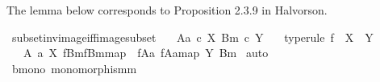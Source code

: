 \begin{isabellebody}
\isamarkupfalse%
%
\endisatagproof
{\isafoldproof}%
%
\isadelimproof
%
\endisadelimproof
%
\begin{isamarkuptext}%
The lemma below corresponds to Proposition 2.3.9 in Halvorson.%
\end{isamarkuptext}\isamarkuptrue%
\isamarkupfalse%
\ subset{\isacharunderscore}{\kern0pt}inv{\isacharunderscore}{\kern0pt}image{\isacharunderscore}{\kern0pt}iff{\isacharunderscore}{\kern0pt}image{\isacharunderscore}{\kern0pt}subset{\isacharcolon}{\kern0pt}\isanewline
\ \ \ {\isachardoublequoteopen}{\isacharparenleft}{\kern0pt}A{\isacharcomma}{\kern0pt}a{\isacharparenright}{\kern0pt}\ {\isasymsubseteq}\isactrlsub c\ X{\isachardoublequoteclose}\ {\isachardoublequoteopen}{\isacharparenleft}{\kern0pt}B{\isacharcomma}{\kern0pt}m{\isacharparenright}{\kern0pt}\ {\isasymsubseteq}\isactrlsub c\ Y{\isachardoublequoteclose}\ \isanewline
\ \ type{\isacharunderscore}{\kern0pt}rule{\isacharbrackright}{\kern0pt}{\isacharcolon}{\kern0pt}\ {\isachardoublequoteopen}f\ {\isacharcolon}{\kern0pt}\ X\ {\isasymrightarrow}\ Y{\isachardoublequoteclose}\isanewline
\ \ \ {\isachardoublequoteopen}{\isacharparenleft}{\kern0pt}{\isacharparenleft}{\kern0pt}A{\isacharcomma}{\kern0pt}\ a{\isacharparenright}{\kern0pt}\ {\isasymsubseteq}\isactrlbsub X\isactrlesub \ {\isacharparenleft}{\kern0pt}f\isactrlsup {\isacharminus}{\kern0pt}B{\isasymrparr}\isactrlbsub m\isactrlesub {\isacharcomma}{\kern0pt}{\isacharbrackleft}{\kern0pt}f\isactrlsup {\isacharminus}{\kern0pt}B{\isasymrparr}\isactrlbsub m\isactrlesub {\isacharbrackright}{\kern0pt}map{\isacharparenright}{\kern0pt}{\isacharparenright}{\kern0pt}\ {\isacharequal}{\kern0pt}\ {\isacharparenleft}{\kern0pt}{\isacharparenleft}{\kern0pt}f{\isasymlparr}A{\isasymrparr}\isactrlbsub a\isactrlesub {\isacharcomma}{\kern0pt}\ {\isacharbrackleft}{\kern0pt}f{\isasymlparr}A{\isasymrparr}\isactrlbsub a\isactrlesub {\isacharbrackright}{\kern0pt}map{\isacharparenright}{\kern0pt}\ {\isasymsubseteq}\isactrlbsub Y\isactrlesub \ {\isacharparenleft}{\kern0pt}B{\isacharcomma}{\kern0pt}m{\isacharparenright}{\kern0pt}{\isacharparenright}{\kern0pt}{\isachardoublequoteclose}\isanewline
%
\isadelimproof
%
\endisadelimproof
%
\isatagproof
{}\isamarkupfalse%
\ auto\isanewline
\ \ \isamarkupfalse%
\ b{\isacharunderscore}{\kern0pt}mono{\isacharcolon}{\kern0pt}\ {\isachardoublequoteopen}monomorphism{\isacharparenleft}{\kern0pt}m{\isacharparenright}{\kern0pt}{\isachardoublequoteclose}\isanewline

\end{isabellebody}
